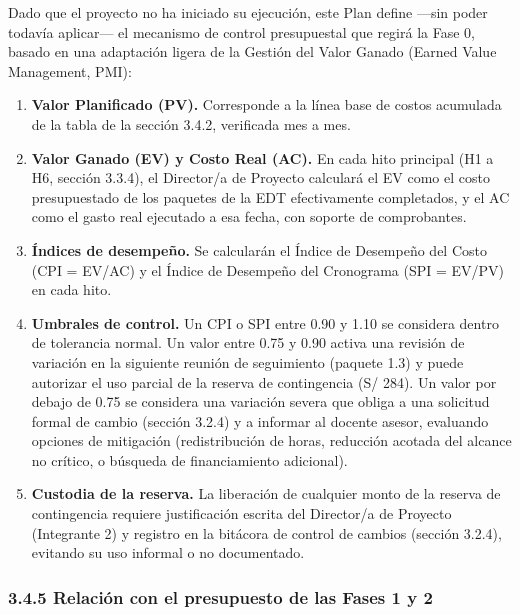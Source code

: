 \documentclass[11pt,a4paper]{article}
\providecommand{\tightlist}{%
  \setlength{\itemsep}{0pt}\setlength{\parskip}{0pt}}
\begin{document}
Dado que el proyecto no ha iniciado su ejecución, este Plan define ---sin poder todavía aplicar--- el mecanismo de control presupuestal que regirá la Fase 0, basado en una adaptación ligera de la Gestión del Valor Ganado (Earned Value Management, PMI):

\begin{enumerate}
\def\labelenumi{\arabic{enumi}.}
\tightlist
\item
  \textbf{Valor Planificado (PV).} Corresponde a la línea base de costos acumulada de la tabla de la sección 3.4.2, verificada mes a mes.
\item
  \textbf{Valor Ganado (EV) y Costo Real (AC).} En cada hito principal (H1 a H6, sección 3.3.4), el Director/a de Proyecto calculará el EV como el costo presupuestado de los paquetes de la EDT efectivamente completados, y el AC como el gasto real ejecutado a esa fecha, con soporte de comprobantes.
\item
  \textbf{Índices de desempeño.} Se calcularán el Índice de Desempeño del Costo (CPI = EV/AC) y el Índice de Desempeño del Cronograma (SPI = EV/PV) en cada hito.
\item
  \textbf{Umbrales de control.} Un CPI o SPI entre 0.90 y 1.10 se considera dentro de tolerancia normal. Un valor entre 0.75 y 0.90 activa una revisión de variación en la siguiente reunión de seguimiento (paquete 1.3) y puede autorizar el uso parcial de la reserva de contingencia (S/ 284). Un valor por debajo de 0.75 se considera una variación severa que obliga a una solicitud formal de cambio (sección 3.2.4) y a informar al docente asesor, evaluando opciones de mitigación (redistribución de horas, reducción acotada del alcance no crítico, o búsqueda de financiamiento adicional).
\item
  \textbf{Custodia de la reserva.} La liberación de cualquier monto de la reserva de contingencia requiere justificación escrita del Director/a de Proyecto (Integrante 2) y registro en la bitácora de control de cambios (sección 3.2.4), evitando su uso informal o no documentado.
\end{enumerate}

\subsubsection{3.4.5 Relación con el presupuesto de las Fases 1 y 2}\label{relaciuxf3n-con-el-presupuesto-de-las-fases-1-y-2}
\end{document}
